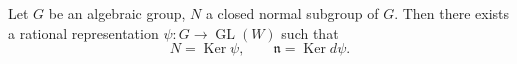 Let $G$ be an algebraic group, $N$ a closed normal subgroup of $G$. Then there exists a rational representation $\psi: G \to \operatorname{GL}(W)$ such that
$$N = \operatorname{Ker} \psi, \qquad \mathfrak{n} = \operatorname{Ker} d\psi.$$
